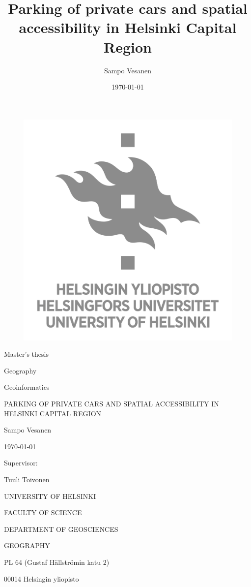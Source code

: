 \documentclass[a4paper,11pt]{article}
\author{Sampo Vesanen}
\date{\today}
\title{Parking of private cars and spatial accessibility in Helsinki Capital Region}
\begin{document}
\begin{titlepage}{
    \centering
    \begin{figure}[t]
    \centering
    \includegraphics[scale=0.4]{HY_logo}
    \end{figure}
    
    Master's thesis \par
    Geography \par
    Geoinformatics \par
    
    \bigskip
    PARKING OF PRIVATE CARS AND SPATIAL ACCESSIBILITY IN HELSINKI CAPITAL REGION
    
    \bigskip
    Sampo Vesanen
    
    \mydate\today
    
    \vfill
    
    Supervisor: \par
    Tuuli Toivonen \par
    \bigskip
    \bigskip
    UNIVERSITY OF HELSINKI\par
    FACULTY OF SCIENCE\par
    DEPARTMENT OF GEOSCIENCES\par
    GEOGRAPHY\par
    PL 64 (Gustaf Hällströmin katu 2)\par
    00014 Helsingin yliopisto\par
}
\end{titlepage}
\end{document}
